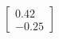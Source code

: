 \documentclass[preview]{standalone}
\begin{document}
\begin{align*}
\begin{bmatrix} 0.42 \\ -0.25 \end{bmatrix}
\end{align*}
\end{document}
